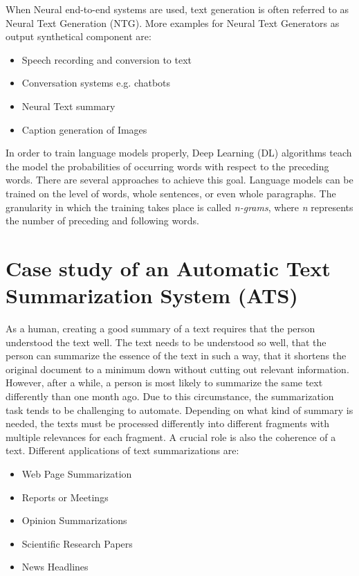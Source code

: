 When Neural end-to-end systems are used, text generation is often referred to as Neural Text Generation (NTG). More examples for Neural Text Generators as output synthetical component are:

\begin{itemize}
\item Speech recording and conversion to text
\item Conversation systems e.g. chatbots
\item Neural Text summary
\item Caption generation of Images
\end{itemize} 

In order to train language models properly, Deep Learning (DL) algorithms teach the model the probabilities of occurring words with respect to the preceding words. There are several approaches to achieve this goal. Language models can be trained on the level of words, whole sentences, or even whole paragraphs. The granularity in which the training takes place is called \textit{n-grams}, where \textit{n} represents the number of preceding and following words. 


\section{Case study of an Automatic Text Summarization System (ATS)}\label{ss:case}

As a human, creating a good summary of a text requires that the person understood the text well. The text needs to be understood so well, that the person can summarize the essence of the text in such a way, that it shortens the original document to a minimum down without cutting out relevant information. However, after a while, a person is most likely to summarize the same text differently than one month ago. Due to this circumstance, the summarization task tends to be challenging to automate. Depending on what kind of summary is needed, the texts must be processed differently into different fragments with multiple relevances for each fragment. A crucial role is also the coherence of a text. Different applications of text summarizations are:

\begin{itemize}
	\item Web Page Summarization
	\item Reports or Meetings
	\item Opinion Summarizations
	\item Scientific Research Papers
	\item News Headlines
\end{itemize}


